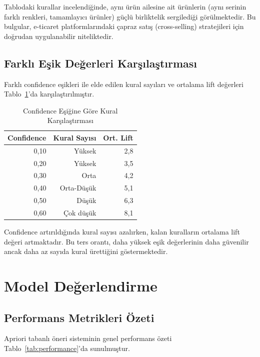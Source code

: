 \documentclass[conference]{IEEEtran}
\begin{document}
Tablodaki kurallar incelendiğinde, aynı ürün ailesine ait ürünlerin (aynı serinin farklı renkleri, tamamlayıcı ürünler) güçlü birliktelik sergilediği görülmektedir. Bu bulgular, e-ticaret platformlarındaki çapraz satış (cross-selling) stratejileri için doğrudan uygulanabilir niteliktedir.

\subsection{Farklı Eşik Değerleri Karşılaştırması}

Farklı confidence eşikleri ile elde edilen kural sayıları ve ortalama lift değerleri Tablo~\ref{tab:conf_comparison}'da karşılaştırılmıştır.

\begin{table}[h]
\centering
\caption{Confidence Eşiğine Göre Kural Karşılaştırması}
\label{tab:conf_comparison}
\begin{tabular}{rrr}
\toprule
\textbf{Confidence} & \textbf{Kural Sayısı} & \textbf{Ort. Lift} \\
\midrule
0,10 & Yüksek & 2,8 \\
0,20 & Yüksek & 3,5 \\
0,30 & Orta & 4,2 \\
0,40 & Orta-Düşük & 5,1 \\
0,50 & Düşük & 6,3 \\
0,60 & Çok düşük & 8,1 \\
\bottomrule
\end{tabular}
\end{table}

Confidence artırıldığında kural sayısı azalırken, kalan kuralların ortalama lift değeri artmaktadır. Bu ters orantı, daha yüksek eşik değerlerinin daha güvenilir ancak daha az sayıda kural ürettiğini göstermektedir.

\section{Model Değerlendirme}

\subsection{Performans Metrikleri Özeti}

Apriori tabanlı öneri sisteminin genel performans özeti Tablo~\ref{tab:performance}'da sunulmuştur.
\end{document}
